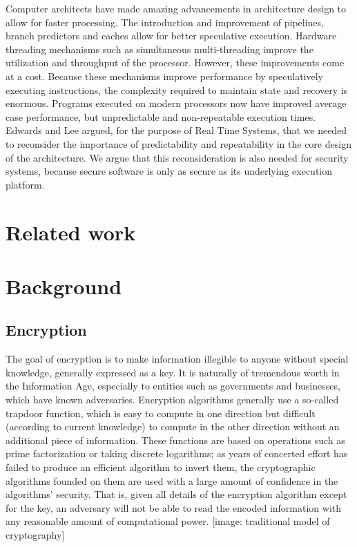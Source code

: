 \documentclass[times, 10pt,twocolumn]{article}
\begin{document}
Computer architects have made amazing advancements in architecture design to allow for faster processing. The introduction and improvement of pipelines, branch predictors and caches allow for better speculative execution. Hardware threading mechanisms such as simultaneous multi-threading improve the utilization and throughput of the processor. However, these improvements come at a cost. Because these mechanisms improve performance by speculatively executing instructions, the complexity required to maintain state and recovery is enormous. Programs executed on modern processors now have improved average case performance, but unpredictable and non-repeatable execution times. Edwards and Lee\cite{edwards2007case} argued, for the purpose of Real Time Systems, that we needed to reconsider the importance of predictability and repeatability in the core design of the architecture. We argue that this reconsideration is also needed for security systems, because secure software is only as secure as its underlying execution platform. 


\section{Related work}

\section{Background}
\subsection{Encryption}
The goal of encryption is to make information illegible to anyone without special knowledge, generally expressed as a key.  It is naturally of tremendous worth in the Information Age, especially to entities such as governments and businesses, which have known adversaries.  Encryption algorithms generally use a so-called trapdoor function, which is easy to compute in one direction but difficult (according to current knowledge) to compute in the other direction without an additional piece of information.  These functions are based on operations such as prime factorization or taking discrete logarithms; as years of concerted effort has failed to produce an efficient algorithm to invert them, the cryptographic algorithms founded on them are used with a large amount of confidence in the algorithms' security.  That is, given all details of the encryption algorithm except for the key, an adversary will not be able to read the encoded information with any reasonable amount of computational power.  [image: traditional model of cryptography]
\end{document}
